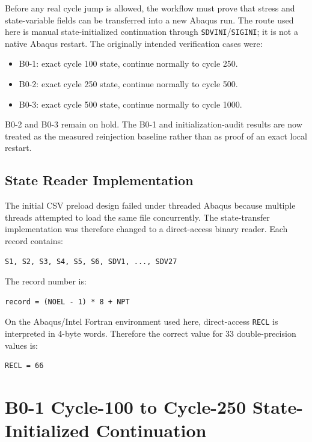 \documentclass[11pt,a4paper]{article}
\newcommand{\code}[1]{\texttt{#1}}
\begin{document}
Before any real cycle jump is allowed, the workflow must prove that stress and state-variable fields can be transferred into a new Abaqus run. The route used here is manual state-initialized continuation through \code{SDVINI}/\code{SIGINI}; it is not a native Abaqus restart. The originally intended verification cases were:

\begin{itemize}
  \item B0-1: exact cycle 100 state, continue normally to cycle 250.
  \item B0-2: exact cycle 250 state, continue normally to cycle 500.
  \item B0-3: exact cycle 500 state, continue normally to cycle 1000.
\end{itemize}

B0-2 and B0-3 remain on hold. The B0-1 and initialization-audit results are now treated as the measured reinjection baseline rather than as proof of an exact local restart.

\subsection{State Reader Implementation}

The initial CSV preload design failed under threaded Abaqus because multiple threads attempted to load the same file concurrently. The state-transfer implementation was therefore changed to a direct-access binary reader. Each record contains:

\begin{verbatim}
S1, S2, S3, S4, S5, S6, SDV1, ..., SDV27
\end{verbatim}

The record number is:

\begin{verbatim}
record = (NOEL - 1) * 8 + NPT
\end{verbatim}

On the Abaqus/Intel Fortran environment used here, direct-access \code{RECL} is interpreted in 4-byte words. Therefore the correct value for 33 double-precision values is:

\begin{verbatim}
RECL = 66
\end{verbatim}

\section{B0-1 Cycle-100 to Cycle-250 State-Initialized Continuation}
\end{document}
